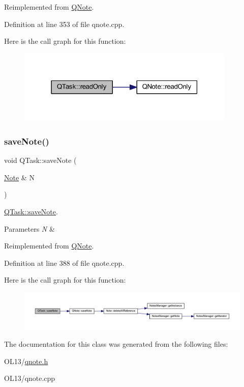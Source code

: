 Reimplemented from \hyperlink{class_q_note_ae6fb14b839acc1979b145a892d6a0a92}{Q\+Note}.



Definition at line 353 of file qnote.\+cpp.

Here is the call graph for this function\+:\nopagebreak
\begin{figure}[H]
\begin{center}
\leavevmode
\includegraphics[width=295pt]{class_q_task_a1bf9080c14e7a94094bde3fa315d66d9_cgraph}
\end{center}
\end{figure}
\mbox{\label{class_q_task_ae304b097cdfd1169d2b190bbad3922eb}} 
\subsubsection{\texorpdfstring{save\+Note()}{saveNote()}}
{\footnotesize\ttfamily void Q\+Task\+::save\+Note (\begin{DoxyParamCaption}\item[{\hyperlink{class_note}{Note} \&}]{N }\end{DoxyParamCaption})\hspace{0.3cm}{\ttfamily [virtual]}}



\hyperlink{class_q_task_ae304b097cdfd1169d2b190bbad3922eb}{Q\+Task\+::save\+Note}. 


\begin{DoxyParams}{Parameters}
{\em N} & \\
\hline
\end{DoxyParams}


Reimplemented from \hyperlink{class_q_note_a577f684ef199a17dc468d706b1383581}{Q\+Note}.



Definition at line 388 of file qnote.\+cpp.

Here is the call graph for this function\+:\nopagebreak
\begin{figure}[H]
\begin{center}
\leavevmode
\includegraphics[width=350pt]{class_q_task_ae304b097cdfd1169d2b190bbad3922eb_cgraph}
\end{center}
\end{figure}


The documentation for this class was generated from the following files\+:\begin{DoxyCompactItemize}
\item 
O\+L13/\hyperlink{qnote_8h}{qnote.\+h}\item 
O\+L13/qnote.\+cpp\end{DoxyCompactItemize}
